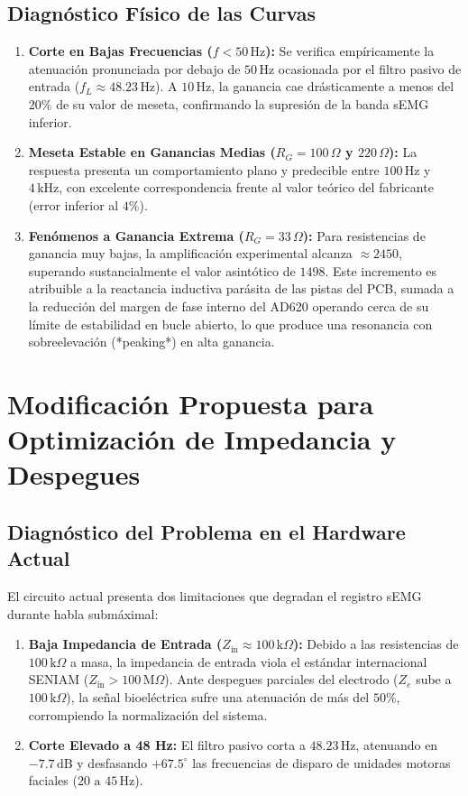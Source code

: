 \documentclass[10pt,a4paper]{article}
\begin{document}
\subsection{Diagnóstico Físico de las Curvas}
\begin{enumerate}
    \item \textbf{Corte en Bajas Frecuencias ($f < 50\,\text{Hz}$):} Se verifica empíricamente la atenuación pronunciada por debajo de $50\,\text{Hz}$ ocasionada por el filtro pasivo de entrada ($f_L \approx 48.23\,\text{Hz}$). A $10\,\text{Hz}$, la ganancia cae drásticamente a menos del $20\%$ de su valor de meseta, confirmando la supresión de la banda sEMG inferior.
    \item \textbf{Meseta Estable en Ganancias Medias ($R_G = 100\,\Omega$ y $220\,\Omega$):} La respuesta presenta un comportamiento plano y predecible entre $100\,\text{Hz}$ y $4\,\text{kHz}$, con excelente correspondencia frente al valor teórico del fabricante (error inferior al $4\%$).
    \item \textbf{Fenómenos a Ganancia Extrema ($R_G = 33\,\Omega$):} Para resistencias de ganancia muy bajas, la amplificación experimental alcanza $\approx 2450$, superando sustancialmente el valor asintótico de $1498$. Este incremento es atribuible a la reactancia inductiva parásita de las pistas del PCB, sumada a la reducción del margen de fase interno del AD620 operando cerca de su límite de estabilidad en bucle abierto, lo que produce una resonancia con sobreelevación (*peaking*) en alta ganancia.
\end{enumerate}

\section{Modificación Propuesta para Optimización de Impedancia y Despegues}

\subsection{Diagnóstico del Problema en el Hardware Actual}
El circuito actual presenta dos limitaciones que degradan el registro sEMG durante habla submáximal:
\begin{enumerate}
    \item \textbf{Baja Impedancia de Entrada ($Z_{\text{in}} \approx 100\,\text{k}\Omega$):} Debido a las resistencias de $100\,\text{k}\Omega$ a masa, la impedancia de entrada viola el estándar internacional SENIAM ($Z_{\text{in}} > 100\,\text{M}\Omega$). Ante despegues parciales del electrodo ($Z_e$ sube a $100\,\text{k}\Omega$), la señal bioeléctrica sufre una atenuación de más del $50\%$, corrompiendo la normalización del sistema.
    \item \textbf{Corte Elevado a 48 Hz:} El filtro pasivo corta a $48.23\,\text{Hz}$, atenuando en $-7.7\,\text{dB}$ y desfasando $+67.5^\circ$ las frecuencias de disparo de unidades motoras faciales ($20\text{ a }45\,\text{Hz}$).
\end{enumerate}
\end{document}
